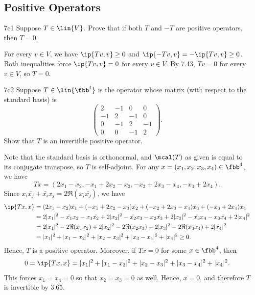 \subsection{Positive Operators}

\begin{exercise}{7c1}
    Suppose $T \in \lin{V}$.
    Prove that if both $T$ and $-T$ are positive operators, then $T = 0$.
\end{exercise}

\begin{sol}
    For every $v \in V$, we have $\ip{Tv, v} \geq 0$ and $\ip{-Tv, v} = -\ip{Tv, v} \geq 0$.
    Both inequalities force $\ip{Tv, v} = 0$ for every $v \in V$.
    By 7.43, $Tv = 0$ for every $v \in V$, so $T = 0$.
\end{sol}

\begin{exercise}{7c2}
    Suppose $T \in \lin{\fbb^4}$ is the operator whose matrix (with respect to the standard basis) is
    \[
        \begin{pmatrix}
            2 & -1 & 0 & 0 \\
            -1 & 2 & -1 & 0 \\
            0 & -1 & 2 & -1 \\
            0 & 0 & -1 & 2
        \end{pmatrix}.
    \]
    Show that $T$ is an invertible positive operator.
\end{exercise}

\begin{sol}
    Note that the standard basis is orthonormal, and $\mcal(T)$ as given is equal to its conjugate transpose, so $T$ is self-adjoint.
    For any $x = (x_1, x_2, x_3, x_4) \in \fbb^4$, we have
    \[
        T x = (2x_1 - x_2, -x_1 + 2x_2 - x_3, -x_2 + 2x_3 - x_4, -x_3 + 2x_4).
    \]
    Since $x_i \bar{x_j} + \bar{x_i} x_j = 2 \Re(x_i \bar{x_j})$, we have
    \begin{align*}
        \ip{T x, x} &= (2x_1 - x_2)\bar{x_1} + (-x_1 + 2x_2 - x_3)\bar{x_2} + (-x_2 + 2x_3 - x_4)\bar{x_3} + (-x_3 + 2x_4)\bar{x_4} \\
        &=2|x_1|^2 - \bar{x_1} x_2 - x_1 \bar{x_2} + 2|x_2|^2 - \bar{x_2} x_3 - x_2 \bar{x_3} + 2|x_3|^2 - \bar{x_3} x_4 - x_3 \bar{x_4} + 2|x_4|^2 \\
        &=2|x_1|^2 - 2\Re(\bar{x_1} x_2) + 2|x_2|^2 - 2\Re(\bar{x_2} x_3) + 2|x_3|^2 - 2\Re(\bar{x_3} x_4) + 2|x_4|^2 \\
        &=|x_1|^2 + |x_1 - x_2|^2 + |x_2 - x_3|^2 + |x_3 - x_4|^2 + |x_4|^2 \geq 0.
    \end{align*}
    Hence, $T$ is a positive operator.
    Moreover, if $T x = 0$ for some $x \in \fbb^4$, then
    \[
        0 = \ip{T x, x} = |x_1|^2 + |x_1 - x_2|^2 + |x_2 - x_3|^2 + |x_3 - x_4|^2 + |x_4|^2.
    \]
    This forces $x_1 = x_4 = 0$ so that $x_2 = x_3 = 0$ as well.
    Hence, $x = 0$, and therefore $T$ is invertible by 3.65.
\end{sol}

